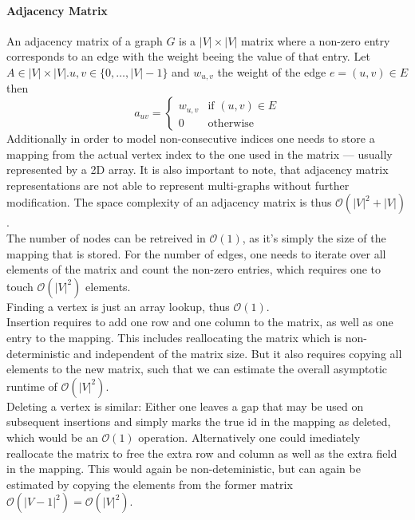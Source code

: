         \paragraph{Adjacency Matrix}
        An adjacency matrix of a graph $G$ is a $|V|\times|V|$ matrix where a non-zero entry corresponds to an edge with the weight beeing the value of that entry. 
        Let $A \in |V|\times|V|. u, v \in \{0, \dots, |V| - 1\}$ and $w_{u,v}$ the weight of the edge $e = (u,v) \in E$ then
        \[ a_{uv} = \begin{cases}
                     w_{u,v} & \text{if } (u,v) \in E \\
                     0 & \text{otherwise}
                    \end{cases}
        \]
        Additionally in order to model non-consecutive indices one needs to store a mapping from the actual vertex index to the one used in the matrix --- usually represented by a 2D array. 
        It is also important to note, that adjacency matrix representations are not able to represent multi-graphs without further modification.
        The space complexity of an adjacency matrix is thus $\mathcal{O}(|V|^2 + |V|)$. \\
                
        The number of nodes can be retreived in $\mathcal{O}(1)$, as it's simply the size of the mapping that is stored.
        For the number of edges, one needs to iterate over all elements of the matrix and count the non-zero entries, which requires one to touch $\mathcal{O}(|V|^2)$ elements.\\

        Finding a vertex is just an array lookup, thus $\mathcal{O}(1)$. \\

        Insertion requires to add one row and one column to the matrix, as well as one entry to the mapping. 
        This includes reallocating the matrix which is non-deterministic and independent of the matrix size. But it also requires copying all elements to the new matrix, such that we can estimate the overall asymptotic runtime of $\mathcal{O}(|V|^2)$. \\
        
        Deleting a vertex is similar: Either one leaves a gap that may be used on subsequent insertions and simply marks the true id in the mapping as deleted, which would be an $\mathcal{O}(1)$ operation. 
        Alternatively one could imediately reallocate the matrix to free the extra row and column as well as the extra field in the mapping. 
        This would again be non-deteministic, but can again be estimated by copying the elements from the former matrix $\mathcal{O}(|V-1|^2) = \mathcal{O}(|V|^2)$. \\
        
